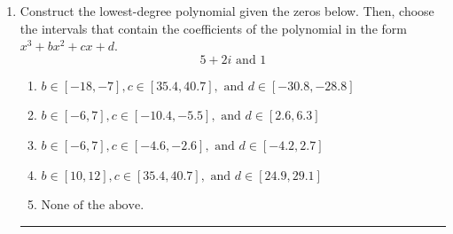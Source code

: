 \documentclass[14pt]{extbook}
\newcommand{\litem}[1]{\item#1\hspace*{-1cm}\rule{\textwidth}{0.4pt}}
\begin{document}
\begin{enumerate}
{\begin{enumerate}[label=\Alph*.]
\end{enumerate} }
\litem{
Construct the lowest-degree polynomial given the zeros below. Then, choose the intervals that contain the coefficients of the polynomial in the form $x^3+bx^2+cx+d$.\[ 5 + 2 i \text{ and } 1 \]\begin{enumerate}[label=\Alph*.]
\item \( b \in [-18, -7], c \in [35.4, 40.7], \text{ and } d \in [-30.8, -28.8] \)
\item \( b \in [-6, 7], c \in [-10.4, -5.5], \text{ and } d \in [2.6, 6.3] \)
\item \( b \in [-6, 7], c \in [-4.6, -2.6], \text{ and } d \in [-4.2, 2.7] \)
\item \( b \in [10, 12], c \in [35.4, 40.7], \text{ and } d \in [24.9, 29.1] \)
\item \( \text{None of the above.} \)


\end{enumerate}}
\end{enumerate}
\end{document}
